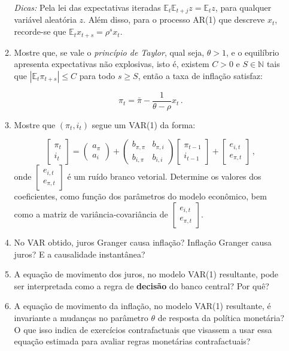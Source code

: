 \documentclass[10pt,a4paper]{article}
\begin{document}
\begin{enumerate}
\begin{enumerate}
	\textit{Dicas:} Pela lei das expectativas iteradas $\mathbb{E}_t \mathbb{E}_{t+j} z = \mathbb{E}_t z$, para qualquer variável aleatória $z$. Além disso, para o processo AR(1) que descreve $x_t$, recorde-se que $\mathbb{E}_t x_{t+s} = \rho^s x_t$.
	
	\item Mostre que, se vale o \emph{princípio de Taylor}, qual seja, $\theta > 1$, e o equilíbrio apresenta expectativas não explosivas, isto é, existem $C > 0$ e $S \in \mathbb{N}$ tais que $|\mathbb{E}_t \pi_{t+s}| \leq C$ para todo $s \geq S$, então a taxa de inflação satisfaz:
	
	$$\pi_t = \bar \pi - \frac{1}{\theta - \rho} x_t \, .$$
	
	\item Mostre que $(\pi_t, i_t)$ segue um VAR(1) da forma:
	
	$$\begin{bmatrix}
	\pi_t \\
	i_t 
	\end{bmatrix} =  \begin{pmatrix}
	a_\pi \\
	a_i
	\end{pmatrix} + \begin{pmatrix}
	b_{\pi,\pi} & b_{\pi,i} \\
	b_{i,\pi} & b_{i,i}
	\end{pmatrix}\begin{bmatrix}
	\pi_{t-1}\\
	i_{t-1}
\end{bmatrix} + \begin{bmatrix}
e_{i,t} \\
e_{\pi, t}
\end{bmatrix} \, ,$$
onde $\begin{bmatrix}
	e_{i,t} \\
	e_{\pi, t}
\end{bmatrix} $ é um ruído branco vetorial. Determine os valores dos coeficientes, como função dos parâmetros do modelo econômico, bem como a matriz de variância-covariância de $\begin{bmatrix}
e_{i,t} \\
e_{\pi, t}
\end{bmatrix} $.
\item No VAR obtido, juros Granger causa inflação? Inflação Granger causa juros? E a causalidade instantânea?
\item A equação de movimento dos juros, no modelo VAR(1) resultante, pode ser interpretada como a regra de \textbf{decisão} do banco central? Por quê?
\item A equação de movimento da inflação, no modelo VAR(1) resultante, é invariante a mudanças no parâmetro $\theta$ de resposta da política monetária? O que isso indica de exercícios contrafactuais que visassem a usar essa equação estimada para avaliar regras monetárias contrafactuais?
\end{enumerate}
\end{enumerate}
\end{document}

